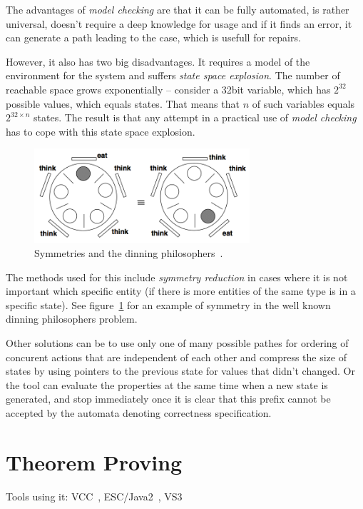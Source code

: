 The advantages of {\em model checking} are that it can be fully automated, is rather universal, doesn't require a deep knowledge for usage and if it finds an error, it can generate a path leading to the case, which is usefull for repairs.

However, it also has two big disadvantages. It requires a model of the environment for the system and suffers {\em state space explosion}. The number of reachable space grows exponentially -- consider a 32bit variable, which has $2^{32}$ possible values, which equals states. That means that $n$ of such variables equals $2^{32\times n}$ states. The result is that any attempt in a practical use of {\em model checking} has to cope with this state space explosion.

\begin{figure}
  \centering
 \includegraphics[width=8cm,keepaspectratio]{fig/dinning-symmetry} %
\caption{Symmetries and the dinning philosophers~\cite{KrenaVojnarOverview}.}
\label{fig:fav:dinning}
\end{figure}

The methods used for this include {\em symmetry reduction} in cases where it is not important which specific entity (if there is more entities of the same type is in a specific state). See figure~\ref{fig:fav:dinning} for an example of symmetry in the well known dinning philosophers problem.

Other solutions can be to use only one of many possible pathes for ordering of concurent actions that are independent of each other and compress the size of states by using pointers to the previous state for values that didn't changed. Or the tool can evaluate the properties at the same time when a new state is generated, and stop immediately once it is clear that this prefix cannot be accepted by the automata denoting correctness specification.




\section{Theorem Proving}\label{chap:fav:theoremProving}
Tools using it: VCC~\cite{KrenaVojnarOverview}, ESC/Java2~\cite{KrenaVojnarOverview}, VS3~\cite{KrenaVojnarOverview}

